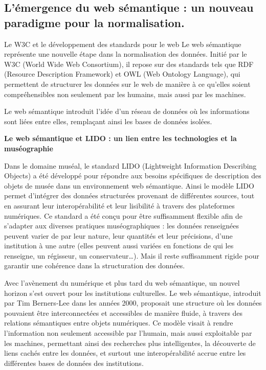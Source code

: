 \subsection{L’émergence du web sémantique : un nouveau paradigme pour la normalisation.}

Le W3C et le développement des standards pour le web
Le web sémantique représente une nouvelle étape dans la normalisation des données. Initié par le W3C (World Wide Web Consortium), il repose sur des standards tels que RDF (Resource Description Framework) et OWL (Web Ontology Language), qui permettent de structurer les données sur le web de manière à ce qu’elles soient compréhensibles non seulement par les humains, mais aussi par les machines.\newline

Le web sémantique introduit l’idée d’un réseau de données où les informations sont liées entre elles, remplaçant ainsi les bases de données isolées.\newline

\textbf{Le web sémantique et LIDO : un lien entre les technologies et la muséographie}\newline

Dans le domaine muséal, le standard LIDO (Lightweight Information Describing Objects) a été développé pour répondre aux besoins spécifiques de description des objets de musée dans un environnement web sémantique. Ainsi le modèle LIDO permet d'intégrer des données structurées provenant de différentes sources, tout en assurant leur interopérabilité et leur lisibilité à travers des plateformes numériques. Ce standard a été conçu pour être suffisamment flexible afin de s’adapter aux diverses pratiques muséographiques : les données renseignées peuvent varier de par leur nature, leur quantités et leur précisions, d’une institution à une autre (elles peuvent aussi variées en  fonctions de qui les renseigne, un régisseur, un conservateur…). Mais il reste suffisamment rigide pour garantir une cohérence dans la structuration des données.\newline

Avec l’avènement du numérique et plus tard du web sémantique, un nouvel horizon s’est ouvert pour les institutions culturelles. Le web sémantique, introduit par Tim Berners-Lee dans les années 2000, proposait une structure où les données pouvaient être interconnectées et accessibles de manière fluide, à travers des relations sémantiques entre objets numériques. Ce modèle visait à rendre l’information non seulement accessible par l’humain, mais aussi exploitable par les machines, permettant ainsi des recherches plus intelligentes, la découverte de liens cachés entre les données, et surtout une interopérabilité accrue entre les différentes bases de données des institutions.\newline

